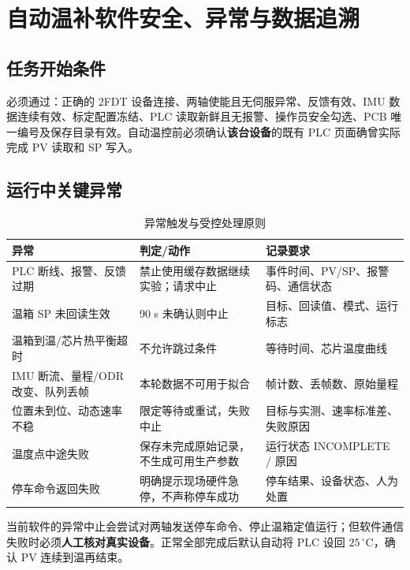 \chapter{自动温补软件安全、异常与数据追溯}
\section{任务开始条件}
必须通过：正确的 2FDT 设备连接、两轴使能且无伺服异常、反馈有效、IMU 数据连续有效、标定配置冻结、PLC 读取新鲜且无报警、操作员安全勾选、PCB 唯一编号及保存目录有效。自动温控前必须确认\textbf{该台设备}的既有 PLC 页面确曾实际完成 PV 读取和 SP 写入。

\section{运行中关键异常}
\begin{table}[H]\centering\small
\caption{异常触发与受控处理原则}
\noindent\begin{tabularx}{\linewidth}{@{}p{40mm}YY@{}}\toprule
异常 & 判定/动作 & 记录要求\\\midrule
PLC 断线、报警、反馈过期 & 禁止使用缓存数据继续实验；请求中止 & 事件时间、PV/SP、报警码、通信状态\\
温箱 SP 未回读生效 & 90 s 未确认则中止 & 目标、回读值、模式、运行标志\\
温箱到温/芯片热平衡超时 & 不允许跳过条件 & 等待时间、芯片温度曲线\\
IMU 断流、量程/ODR 改变、队列丢帧 & 本轮数据不可用于拟合 & 帧计数、丢帧数、原始量程\\
位置未到位、动态速率不稳 & 限定等待或重试，失败中止 & 目标与实测、速率标准差、失败原因\\
温度点中途失败 & 保存未完成原始记录，不生成可用生产参数 & 运行状态 INCOMPLETE / 原因\\
停车命令返回失败 & 明确提示现场硬件急停，不声称停车成功 & 停车结果、设备状态、人为处置\\\bottomrule\end{tabularx}\end{table}
当前软件的异常中止会尝试对两轴发送停车命令、停止温箱定值运行；但软件通信失败时必须\textbf{人工核对真实设备}。正常全部完成后默认自动将 PLC 设回 $25\, ^\circ\mathrm C$，确认 PV 连续到温再结束。

